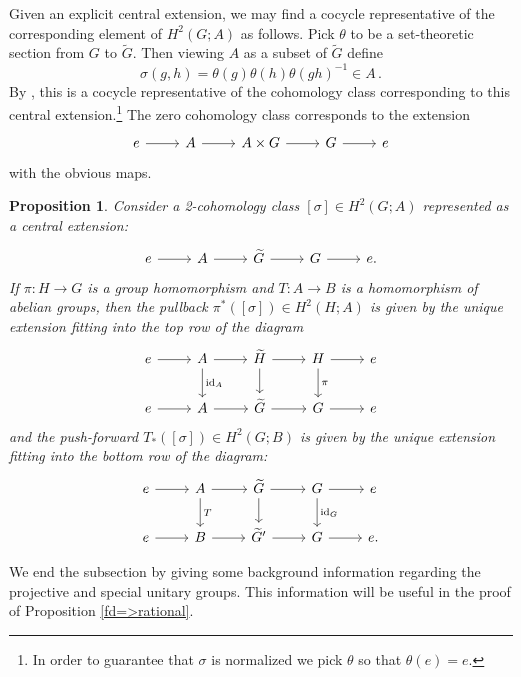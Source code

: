 \documentclass{amsart}
\newtheorem{proposition}[theorem]{Proposition}
\theoremstyle{definition}
\DeclareMathOperator{\id}{id}
\begin{document}
Given an explicit central extension, we may find a cocycle representative of the corresponding element of $H^2(G;A)$ as follows. Pick $\theta$ to be a set-theoretic section from $G$ to $\widetilde{G}$. Then viewing $A$ as a subset of $\widetilde{G}$ define
$$\sigma(g,h)=\theta(g)\theta(h)\theta(gh)^{-1}\in A\,.$$
By \cite[Equation IV.3.3]{coho}, this is a cocycle representative of the cohomology class corresponding to this central extension.\footnote{In order to guarantee that $\sigma$ is normalized we pick $\theta$ so that $\theta(e)=e$.} The zero cohomology class corresponds to the extension
$$\begin{tikzcd}
e\arrow{r} & A
\arrow{r}{} &
A\times G \arrow{r}{}
& G\arrow{r}{}& e
\end{tikzcd}$$
with the obvious maps.

\begin{proposition}\cite[Chapter IV.3 Exercise 1]{coho}\label{exercise}
Consider a 2-cohomology class $[\sigma]\in H^2(G;A)$ represented as a central extension:
$$\begin{tikzcd}
e\arrow{r} & A
\arrow{r}{} &
\widetilde{G} \arrow{r}{}
& G\arrow{r}{}& e.
\end{tikzcd}$$
If $\pi \colon H\rightarrow G$ is a group homomorphism and $T:A\rightarrow B$ is a homomorphism of abelian groups, then the pullback $\pi^*([\sigma])\in H^2(H;A)$ is given by the unique extension fitting into the top row of the diagram
$$\begin{tikzcd}
e\arrow{r} & A
\arrow{r}{}\arrow{d}{\id_A} &
\widetilde{H}\arrow{d} \arrow{r}{}
& H\arrow{r}{}\arrow{d}{\pi}& e
\\
e\arrow{r} & A
\arrow{r}{} &
\widetilde{G} \arrow{r}{}
& G\arrow{r}{}& e
\end{tikzcd}$$
and the push-forward $T_*([\sigma])\in H^2(G;B)$ is given by the unique extension fitting into the bottom row of the diagram:
$$\begin{tikzcd}
e\arrow{r} & A
\arrow{r}{}\arrow{d}{T} &
\widetilde{G}\arrow{d} \arrow{r}{}
& G\arrow{r}{}\arrow{d}{\id_G}& e
\\
e\arrow{r} & B
\arrow{r}{} &
\widetilde{G}' \arrow{r}{}
& G\arrow{r}{}& e.
\end{tikzcd}$$
\end{proposition}
We end the subsection by giving some background information regarding the projective and special unitary groups. This information will be useful in the proof of Proposition \ref{fd=>rational}.
\end{document}

